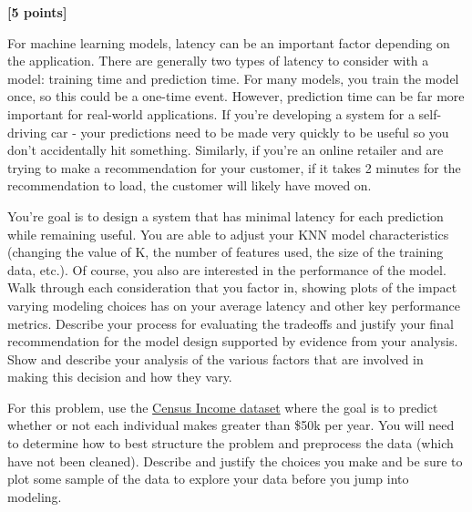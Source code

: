 \documentclass[
  letterpaper,
  DIV=11,
  numbers=noendperiod]{scrartcl}
\begin{document}
\textbf{{[}5 points{]}}

For machine learning models, latency can be an important factor
depending on the application. There are generally two types of latency
to consider with a model: training time and prediction time. For many
models, you train the model once, so this could be a one-time event.
However, prediction time can be far more important for real-world
applications. If you're developing a system for a self-driving car -
your predictions need to be made very quickly to be useful so you don't
accidentally hit something. Similarly, if you're an online retailer and
are trying to make a recommendation for your customer, if it takes 2
minutes for the recommendation to load, the customer will likely have
moved on.

You're goal is to design a system that has minimal latency for each
prediction while remaining useful. You are able to adjust your KNN model
characteristics (changing the value of K, the number of features used,
the size of the training data, etc.). Of course, you also are interested
in the performance of the model. Walk through each consideration that
you factor in, showing plots of the impact varying modeling choices has
on your average latency and other key performance metrics. Describe your
process for evaluating the tradeoffs and justify your final
recommendation for the model design supported by evidence from your
analysis. Show and describe your analysis of the various factors that
are involved in making this decision and how they vary.

For this problem, use the
\href{https://archive.ics.uci.edu/dataset/2/adult}{Census Income
dataset} where the goal is to predict whether or not each individual
makes greater than \$50k per year. You will need to determine how to
best structure the problem and preprocess the data (which have not been
cleaned). Describe and justify the choices you make and be sure to plot
some sample of the data to explore your data before you jump into
modeling.
\end{document}
